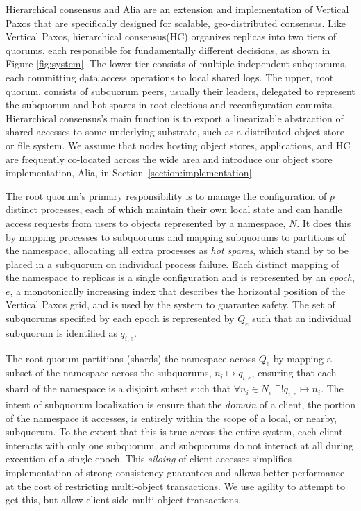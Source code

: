 \documentclass[10pt,conference]{IEEEtran}
\newcommand{\hc}{hierarchical consensus\xspace}
\newcommand{\Hc}{Hierarchical consensus\xspace}
\newcommand{\sub}{subquorum\xspace}
\newcommand{\subs}{subquorums\xspace}
\newcommand{\roo}{root quorum\xspace}
\begin{document}
\Hc and Alia are an extension and implementation of Vertical Paxos that are specifically
designed for scalable, geo-distributed consensus.
Like Vertical Paxos, \hc (HC) organizes replicas into two tiers of quorums, each
responsible for fundamentally different decisions, as shown in Figure \ref{fig:system}.
The lower tier consists of multiple independent subquorums, each committing data access
operations to local shared logs.
The upper, root quorum, consists of subquorum peers, usually their leaders, delegated to
represent the subquorum and hot spares in root elections and reconfiguration commits.
\Hc's main function is to export a linearizable abstraction of shared accesses to some
underlying substrate, such as a distributed object store or file system.
We assume that nodes hosting object stores, applications, and HC are frequently
co-located across the wide area and introduce our object store implementation, Alia,
in Section~\ref{section:implementation}.

The \roo's primary responsibility is to manage the configuration of $p$ distinct
processes, each of which maintain their own local state and can handle access requests
from users to objects represented by a namespace, $N$.
It does this by mapping processes to \subs and mapping \subs to partitions of the
namespace, allocating all extra processes as \emph{hot spares}, which stand by to be
placed in a \sub on individual process failure.
Each distinct mapping of the namespace to replicas is a single configuration and is
represented by an \emph{epoch}, $e$, a monotonically increasing index that describes
the horizontal position of the Vertical Paxos grid, and is used by the system to
guarantee safety.
The set of \subs specified by each epoch is represented by $Q_e$ such that an individual
\sub is identified as $q_{i,e}$.

The \roo partitions (shards) the namespace across $Q_e$ by mapping a subset of the
namespace across the \subs, $n_i \mapsto q_{i,e}$, ensuring that each shard of the
namespace is a disjoint subset such that
$\forall n_i \in N_e$ $\exists! q_{i,e} \mapsto n_i$.
The intent of subquorum localization is ensure that the \emph{domain} of a client, the
portion of the namespace it accesses, is entirely within the scope of a local, or
nearby, subquorum.
To the extent that this is true across the entire system, each client interacts with
only one subquorum, and subquorums do not interact at all during execution of a single
epoch.
This \emph{siloing} of client accesses simplifies implementation of strong consistency
guarantees and allows better performance at the cost of restricting multi-object
transactions.
We use agility to attempt to get this, but allow client-side multi-object transactions.
\end{document}
